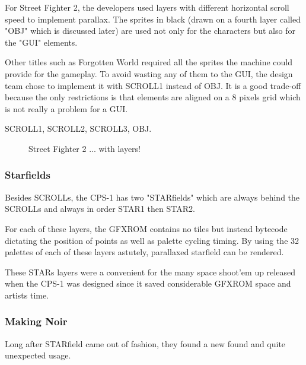 For Street Fighter 2, the developers used layers with different horizontal scroll speed to implement parallax. The sprites in black (drawn on a fourth layer called "OBJ" which is discussed later) are used not only for the characters but also for the "GUI" elements.

Other titles such as Forgotten World required all the sprites the machine could provide for the gameplay. To avoid wasting any of them to the GUI, the design team chose to implement it with SCROLL1 instead of OBJ. It is a good trade-off because the only restrictions is that elements are aligned on a 8 pixels grid which is not really a problem for a GUI.

 SCROLL1,  SCROLL2,  SCROLL3,  OBJ.

\vfill
\begin{figure}[!b]
 \caption*{Street Fighter 2 ... with layers!}%
 \end{figure}%
\pagebreak


\subsubsection{Starfields}
Besides SCROLLs, the CPS-1 has two "STARfields" which are always behind the SCROLLs and always in order STAR1 then STAR2. 

For each of these layers, the GFXROM contains no tiles but instead bytecode dictating the position of points as well as palette cycling timing. By using the 32 palettes of each of these layers astutely, parallaxed starfield can be rendered. 

These STARs layers were a convenient for the many space shoot'em up released when the CPS-1 was designed since it saved considerable GFXROM space and artists time. 



\subsubsection{Making Noir}
Long after STARfield came out of fashion, they found a new found and quite unexpected usage.


